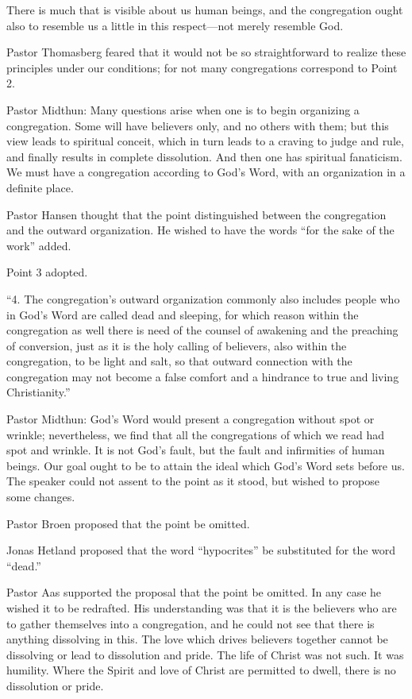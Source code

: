 There is much that is visible about us human beings, and the congregation ought also to resemble us a little in this respect—not merely resemble God.

Pastor Thomasberg feared that it would not be so straightforward to realize these principles under our conditions; for not many congregations correspond to Point 2.

Pastor Midthun: Many questions arise when one is to begin organizing a congregation. Some will have believers only, and no others with them; but this view leads to spiritual conceit, which in turn leads to a craving to judge and rule, and finally results in complete dissolution. And then one has spiritual fanaticism. We must have a congregation according to God’s Word, with an organization in a definite place.

Pastor Hansen thought that the point distinguished between the congregation and the outward organization. He wished to have the words “for the sake of the work” added.

Point 3 adopted.

“4. The congregation’s outward organization commonly also includes people who in God’s Word are called dead and sleeping, for which reason within the congregation as well there is need of the counsel of awakening and the preaching of conversion, just as it is the holy calling of believers, also within the congregation, to be light and salt, so that outward connection with the congregation may not become a false comfort and a hindrance to true and living Christianity.”

Pastor Midthun: God’s Word would present a congregation without spot or wrinkle; nevertheless, we find that all the congregations of which we read had spot and wrinkle. It is not God’s fault, but the fault and infirmities of human beings. Our goal ought to be to attain the ideal which God’s Word sets before us. The speaker could not assent to the point as it stood, but wished to propose some changes.

Pastor Broen proposed that the point be omitted.

Jonas Hetland proposed that the word “hypocrites” be substituted for the word “dead.”

Pastor Aas supported the proposal that the point be omitted. In any case he wished it to be redrafted. His understanding was that it is the believers who are to gather themselves into a congregation, and he could not see that there is anything dissolving in this. The love which drives believers together cannot be dissolving or lead to dissolution and pride. The life of Christ was not such. It was humility. Where the Spirit and love of Christ are permitted to dwell, there is no dissolution or pride.

